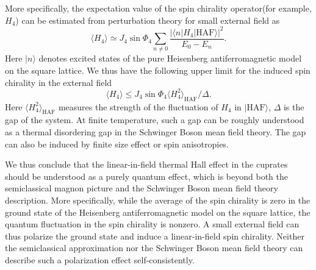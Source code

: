 \documentclass[prb,twocolumn,showpacs]{revtex4}
\begin{document}
More specifically, the expectation value of the spin chirality operator(for example, $H_{4}$) can be estimated from perturbation theory for small external field as 
\begin{equation}
\langle H_{4} \rangle\simeq J_{4}\sin{\Phi_{4}}\sum_{n\neq0}\frac{|\langle n |H_{4}|\mathrm{HAF}\rangle|^{2}}{E_{0}-E_{n}}.
\end{equation}
Here $| n \rangle$ denotes excited states of the pure Heisenberg antiferromagnetic model on the square lattice. We thus have the following upper limit for the induced spin chirality in the external field
\begin{equation}
\langle H_{4} \rangle \leq J_{4}\sin{\Phi_{4}} \langle H^{2}_{4}\rangle_{\mathrm{HAF}}/\Delta.
\end{equation}
Here $\langle H^{2}_{4}\rangle_{\mathrm{HAF}}$ measures the strength of the fluctuation of $H_{4}$ in $|\mathrm{HAF}\rangle$, $\Delta$ is the gap of the system. At finite temperature, such a gap can be roughly understood as a thermal disordering gap in the Schwinger Boson mean field theory. The gap can also be induced by finite size effect or spin anisotropies.

We thus conclude that the linear-in-field thermal Hall effect in the cuprates should be understood as a purely quantum effect, which is beyond both the semiclassical magnon picture and the Schwinger Boson mean field theory description. More specifically, while the average of the spin chirality is zero in the ground state of the Heisenberg antiferromagnetic model on the square lattice, the quantum fluctuation in the spin chirality is nonzero. A small external field can thus polarize the ground state and induce a linear-in-field spin chirality.  Neither the semiclassical approximation nor the Schwinger Boson mean field theory can describe such a polarization effect self-consistently. 
\end{document}
